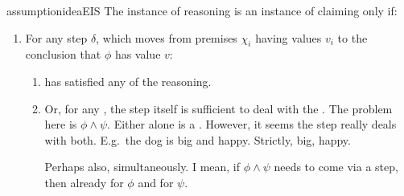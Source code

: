 \begin{note}
\begin{restatable}{assumption}{ideaEIS}
    The instance of reasoning is an instance of claiming \support{} only if:
    \begin{enumerate}
    \item
      \label{idea:CS:B:step}
      For any step \(\delta\), which moves from premises \(\chi_{i}\) having values \(v_{i}\) to the conclusion that \(\phi\) has value \(v\):
      \begin{enumerate}[label=\alph*., ref=(\alph*)]
      \item
        \vAgent{} has satisfied any \requ{} of the reasoning.
      \item
        Or, for any \requ{}, the step itself is sufficient to deal with the \requ{}. {\color{red} The problem here is \(\phi \land \psi\). Either alone is a \requ{}. However, it seems the step really deals with both.}
        E.g.\ the dog is big and happy.
        Strictly, big, happy.

        Perhaps also, simultaneously.
        I mean, if \(\phi \land \psi\) needs to come via a step, then already for \(\phi\) and for \(\psi\).
      \end{enumerate}
    \end{enumerate}
    \vspace{-\baselineskip}
  \end{restatable}
\end{note}

